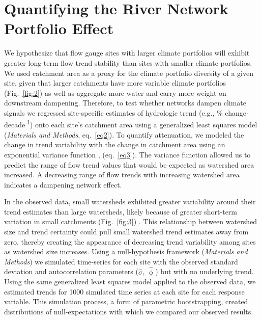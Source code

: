 \documentclass[9pt,twocolumn,twoside,lineno]{pnas-new}
\begin{document}
\section*{Quantifying the River Network Portfolio Effect}
We hypothesize that flow gauge sites with larger climate portfolios will exhibit greater long-term flow trend stability than sites with smaller climate portfolios. We used catchment area as a proxy for the climate portfolio diversity of a given site, given that larger catchments have more variable climate portfolios (Fig.~\ref{fig:2}) as well as aggregate more water and carry more weight on downstream dampening. Therefore, to test whether networks dampen climate signals we regressed site-specific estimates of hydrologic trend (e.g., \% change$\cdot$decade\textsuperscript{-1}) onto each site's catchment area using a generalized least squares model (\textit{Materials and Methods}, eq.~\ref{eq2}). To quantify attenuation, we modeled the change in trend variability with the change in catchment area using an exponential variance function \cite{Pinheiro:2000}, (eq.~\ref{eq3}). The variance function allowed us to predict the range of flow trend values that would be expected as watershed area increased. A decreasing range of flow trends with increasing watershed area indicates a dampening network effect.

In the observed data, small watersheds exhibited greater variability around their trend estimates than large watersheds, likely because of greater short-term variation in small catchments (Fig.~\ref{fig:3}) \cite{Moore:2015}. This relationship between watershed size and trend certainty could pull small watershed trend estimates away from zero, thereby creating the appearance of decreasing trend variability among sites as watershed size increases. Using a null-hypothesis framework (\textit{Materials and Methods}) we simulated time-series for each site with the observed standard deviation and autocorrelation parameters ($\hat{\sigma}$, $\hat{\upphi}$) but with no underlying trend. Using the same generalized least squares model applied to the observed data, we estimated trends for 1000 simulated time series at each site for each response variable. This simulation process, a form of parametric bootstrapping, created distributions of null-expectations with which we compared our observed results.
\end{document}
